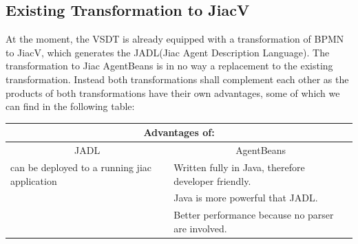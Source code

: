 \subsection{Existing Transformation to JiacV}
At the moment, the VSDT is already equipped with a transformation of BPMN to JiacV, which generates the JADL(Jiac Agent Description Language).
The transformation to Jiac AgentBeans is in no way a replacement to the existing transformation. Instead both transformations shall complement each other as the products of both transformations have their own advantages, some of which we can find in the following table:
\begin{table}[htbp]
	\centering
		\begin{tabularx}{\linewidth}{|l|X|}\hline\hline
			\multicolumn{2}{|c|}{\textbf{Advantages of:}} \\\hline
			\multicolumn{1}{|c|}{JADL} & \multicolumn{1}{c|}{AgentBeans}\\\hline
			can be deployed to a running jiac application &  Written fully in Java, therefore developer friendly.\\
																										&  Java is more powerful that JADL.\\
			                           										&  Better performance because no parser are involved.\\\hline\hline
		\end{tabularx}
\end{table}


